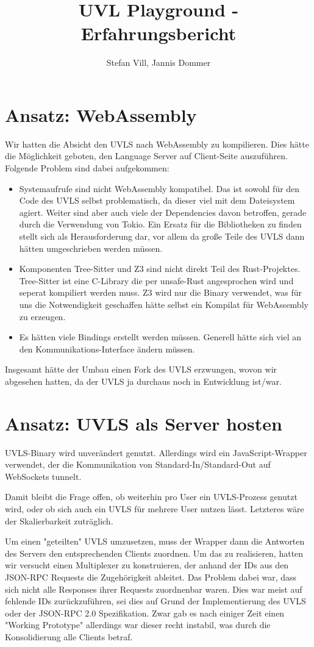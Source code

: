 \documentclass{article}
\title{UVL Playground - Erfahrungsbericht}
\author{Stefan Vill, Jannis Dommer}
\begin{document}
\maketitle

\section{Ansatz: WebAssembly}
Wir hatten die Absicht den UVLS nach WebAssembly zu kompilieren.
Dies hätte die Möglichkeit geboten, den Language Server auf Client-Seite auszuführen.
Folgende Problem sind dabei aufgekommen:

\begin{itemize}
    \item Systemaufrufe sind nicht WebAssembly kompatibel. Das ist sowohl für den Code des UVLS selbst problematisch, da dieser viel mit dem Dateisystem agiert. Weiter sind aber auch viele der Dependencies davon betroffen, gerade durch die Verwendung von Tokio. Ein Ersatz für die Bibliotheken zu finden stellt sich als Herausforderung dar, vor allem da große Teile des UVLS dann hätten umgeschrieben werden müssen.
    \item Komponenten Tree-Sitter und Z3 sind nicht direkt Teil des Rust-Projektes. Tree-Sitter ist eine C-Library die per unsafe-Rust angesprochen wird und seperat kompiliert werden muss. Z3 wird nur die Binary verwendet, was für uns die Notwendigkeit geschaffen hätte selbst ein Kompilat für WebAssembly zu erzeugen. 
    \item Es hätten viele Bindings erstellt werden müssen. Generell hätte sich viel an den Kommunikations-Interface ändern müssen.
\end{itemize}

Insgesamt hätte der Umbau einen Fork des UVLS erzwungen, wovon wir abgesehen hatten, da der UVLS ja durchaus noch in Entwicklung ist/war.

\section{Ansatz: UVLS als Server hosten}
UVLS-Binary wird unverändert genutzt. 
Allerdings wird ein JavaScript-Wrapper verwendet, der die Kommunikation von Standard-In/Standard-Out auf WebSockets tunnelt.

Damit bleibt die Frage offen, ob weiterhin pro User ein UVLS-Prozess genutzt wird, oder ob sich auch ein UVLS für mehrere User nutzen lässt. Letzteres wäre der Skalierbarkeit zuträglich.

Um einen "geteilten" UVLS umzusetzen, muss der Wrapper dann die Antworten des Servers den entsprechenden Clients zuordnen.
Um das zu realisieren, hatten wir versucht einen Multiplexer zu konstruieren, der anhand der IDs aus den JSON-RPC Requests die Zugehörigkeit ableitet.
Das Problem dabei war, dass sich nicht alle Responses ihrer Requests zuordnenbar waren.
Dies war meist auf fehlende IDs zurückzuführen, sei dies auf Grund der Implementierung des UVLS oder der JSON-RPC 2.0 Spezifikation.
Zwar gab es nach einiger Zeit einen "Working Prototype" allerdings war dieser recht instabil, was durch die Konsolidierung alle Clients betraf.
\end{document}
